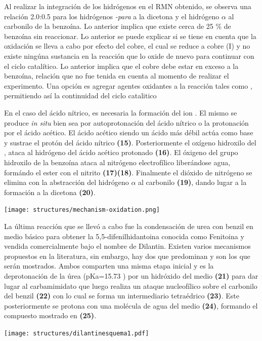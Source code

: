 \documentclass[fleqn,10pt]{SelfArx}
\begin{document}
Al realizar la integraci\'on de los hidr\'ogenos en el RMN obtenido, se observa una relaci\'on 2.0:0.5 para los hidr\'ogenos \textit{-para} a la dicetona y el hidr\'ogeno $\alpha$ al carbonilo de la benzo\'ina. Lo anterior implica que existe cerca de 25 \% de benzo\'ina sin reaccionar. Lo anterior se puede explicar si se tiene en cuenta que la oxidaci\'on se lleva a cabo por efecto del cobre, el cual se reduce a cobre (I) y no existe ning\'una sustancia en la reacci\'on que lo oxide de nuevo para continuar con el ciclo catal\'itico. Lo anterior implica que el cobre debe estar en exceso a la benzo\'ina, relaci\'on que no fue tenida en cuenta al momento de realizar el experimento. Una opci\'on es agregar agentes oxidantes a la reacci\'on tales como , permitiendo as\'i la continuidad del ciclo catalitico

En el caso del \'acido n\'itrico, es necesaria la formaci\'on del ion . El mismo se produce \textit{in situ} bien sea por autoprotonaci\'on del \'acido n\'itrico o la protonaci\'on por el \'acido ac\'etico. El \'acido ac\'etico siendo un \'acido m\'as d\'ebil act\'ua como base y sustrae el prot\'on del \'acido n\'itrico \textbf{(15)}. Posteriormente el ox\'igeno hidroxilo del , ataca al hidr\'ogeno del \'acido ac\'etico protonado \textbf{(16)}. El \'oxigeno del grupo hidroxilo de la benzo\'ina ataca al nitr\'ogeno electrof\'ilico liber\'andose agua, form\'ando el ester con el nitrito \textbf{(17)(18)}. Finalmente el di\'oxido de nitr\'ogeno se elimina con la abstracci\'on del hidr\'ogeno $\alpha$ al carbonilo \textbf{(19)}, dando lugar a la formaci\'on a la dicetona \textbf{(20)}.
\begin{scheme}[h]
	\centering
	\caption{Mecanismo de oxidaci\'on de la benzo\'ina por \'acido n\'itrico \cite{pavia2010}.}
	\texttt{[image: structures/mechanism-oxidation.png]}
\end{scheme}
\pagebreak

La última reacción que se llevó a cabo fue la condensación de urea con benzil en medio básico para obtener la 5,5-difenilhidantoina conocida como Fenitoina y vendida comercialmente bajo el nombre de Dilantin. Existen varios mecanismos propuestos en la literatura, sin embargo, hay dos que predominan y son los que serán mostrados. Ambos comparten una misma etapa inicial y es la deprotonación de la úrea (pKa=15.73 \cite{urea}) por un hidróxido del medio \textbf{(21)} para dar lugar al carbamimidato que luego realiza un ataque nucleofílico sobre el carbonilo del benzil \textbf{(22)} con lo cual se forma un intermediario tetraédrico \textbf{(23)}. Este posteriormente se protona con una molécula de agua del medio \textbf{(24)}, formando el compuesto mostrado en \textbf{(25)}. 
\begin{scheme}[h]
	\centering
	\caption{Primera etapa del mecanismo de condensaci\'on de la \'urea con bezil.}
	\texttt{[image: structures/dilantinesquema1.pdf]}
\end{scheme}
\end{document}
